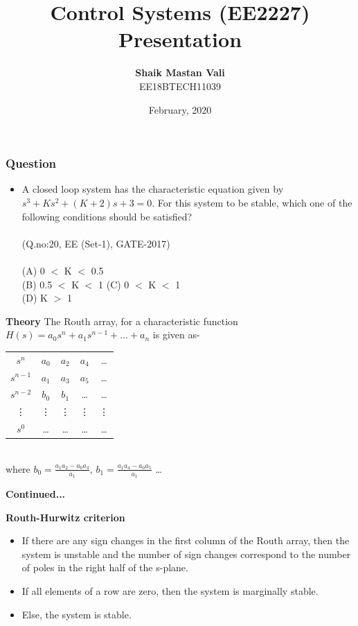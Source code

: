 \documentclass{beamer}
\title{\textbf{Control Systems (EE2227) Presentation}}
\author{\textbf{Shaik Mastan Vali}\\EE18BTECH11039}
\date{February, 2020}
\begin{document}
\maketitle
\begin{frame}
\frametitle{\textbf{Question}}
\begin{itemize}
\item A closed loop system has the characteristic equation given by \(s^3+Ks^2+(K+2)s+3 = 0\). For this system to be stable, which one of the following conditions should be satisfied? \\~\\(Q.no:20, EE (Set-1), GATE-2017)\\~\\
(A) 0 \(<\) K \(<\) 0.5 \\ (B) 0.5 \(<\) K \(<\) 1 \newline(C) 0 \(<\) K \(<\) 1  \\ (D) K \(>\) 1
\end{itemize}
\end{frame}

\begin{frame}{\textbf{Theory}}
The Routh array, for a characteristic function \(H(s) = a_0s^n+a_1s^{n-1}+\ldots+a_n\) is given as-
\begin{center}
\begin{tabular}{ c c c c c}
 \(s^n\) & \(a_0\) & \(a_2\) & \(a_4\) & \ldots \\
 \(s^{n-1}\) & \(a_1\) & \(a_3\) & \(a_5\) & \ldots \\ 
 \(s^{n-2}\) & \(b_0\) & \(b_1\) & \dots & \dots\\
 \vdots & \vdots & \vdots & \vdots & \vdots \\
 \(s^0\) & \dots & \dots & \dots & \dots
\end{tabular}
\end{center}
\\
where \(b_0 = \frac{a_1a_2-a_0a_3}{a_1}\), \(b_1 = \frac{a_1a_4-a_0a_5}{a_1}\) \dots
\end{frame}

\begin{frame}{\textbf{Continued...}}
\begin{center}
    \textbf{Routh-Hurwitz criterion}
\end{center}
\begin{itemize}
    \item If there are any sign changes in the first column of the Routh array, then the system is unstable and the number of sign changes correspond to the number of poles in the right half of the s-plane.
    \item If all elements of a row are zero, then the system is marginally stable.
    \item Else, the system is stable.
\end{itemize}
\end{frame}
\end{document}
